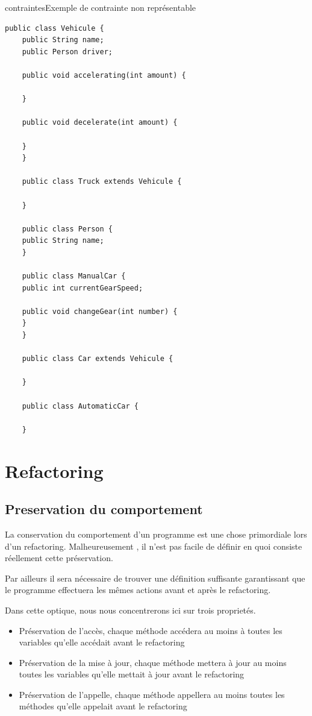 \documentclass[a4paper, 12pt]{article}
\begin{document}
\begin{figu}{contraintes}{Exemple de contrainte non représentable}
  \begin{lstlisting}[frame=single]
    public class Vehicule {
    public String name;
    public Person driver;

    public void accelerating(int amount) {

    }

    public void decelerate(int amount) {

    }
    }

    public class Truck extends Vehicule {

    }

    public class Person {
    public String name;
    }

    public class ManualCar {
    public int currentGearSpeed;

    public void changeGear(int number) {
    }
    }

    public class Car extends Vehicule {

    }

    public class AutomaticCar {

    }
  \end{lstlisting}

  \newpage
  \section{Refactoring}

  \subsection{Preservation du comportement}
  \label{subsec:preservationDuComportement}

  La conservation du comportement d'un programme est une chose primordiale lors d'un refactoring.
  Malheureusement , il n'est pas facile de définir en quoi consiste réellement cette préservation.

  Par ailleurs il sera nécessaire de trouver une définition suffisante garantissant que le programme effectuera les mêmes actions avant et après le refactoring.

  Dans cette optique, nous nous concentrerons ici sur trois proprietés.

  \begin{itemize}[label=\textbullet]
    \item Préservation de l'accès, chaque méthode accédera au moins à toutes les variables qu'elle accédait avant le refactoring
    \item Préservation de la mise à jour, chaque méthode mettera à jour au moins toutes les variables qu'elle mettait à jour avant le refactoring
    \item Préservation de l'appelle, chaque méthode appellera au moins toutes les méthodes qu'elle appelait avant le refactoring
  \end{itemize}


\end{figu}
\end{document}
